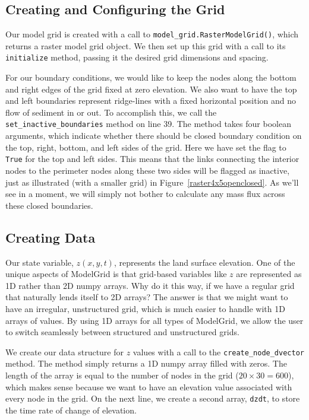 \documentclass[12pt]{article}
\newcommand{\code}[1]{{\tt #1}}
\begin{document}
\subsection{Creating and Configuring the Grid}



Our model grid is created with a call to \code{model\_grid.RasterModelGrid()}, which returns a raster model grid object. We then set up this grid with a call to its \code{initialize} method, passing it the desired grid dimensions and spacing.

For our boundary conditions, we would like to keep the nodes along the bottom and right edges of the grid fixed at zero elevation. We also want to have the top and left boundaries represent ridge-lines with a fixed horizontal position and no flow of sediment in or out. To accomplish this, we call the \code{set\_inactive\_boundaries} method on line 39. The method takes four boolean arguments, which indicate whether there should be closed boundary condition on the top, right, bottom, and left sides of the grid. Here we have set the flag to \code{True} for the top and left sides. This means that the links connecting the interior nodes to the perimeter nodes along these two sides will be flagged as inactive, just as illustrated (with a smaller grid) in Figure~\ref{raster4x5openclosed}. As we'll see in a moment, we will simply not bother to calculate any mass flux across these closed boundaries.


\subsection{Creating Data}



Our state variable, $z(x,y,t)$, represents the land surface elevation. One of the unique aspects of ModelGrid is that grid-based variables like $z$ are represented as 1D rather than 2D numpy arrays. Why do it this way, if we have a regular grid that naturally lends itself to 2D arrays? The answer is that we might want to have an irregular, unstructured grid, which is much easier to handle with 1D arrays of values. By using 1D arrays for all types of ModelGrid, we allow the user to switch seamlessly between structured and unstructured grids.

We create our data structure for $z$ values with a call to the \code{create\_node\_dvector} method. The method simply returns a 1D numpy array filled with zeros. The length of the array is equal to the number of nodes in the grid ($20\times 30=600$), which makes sense because we want to have an elevation value associated with every node in the grid.
On the next line, we create a second array, \code{dzdt}, to store the time rate of change of elevation. 
\end{document}
